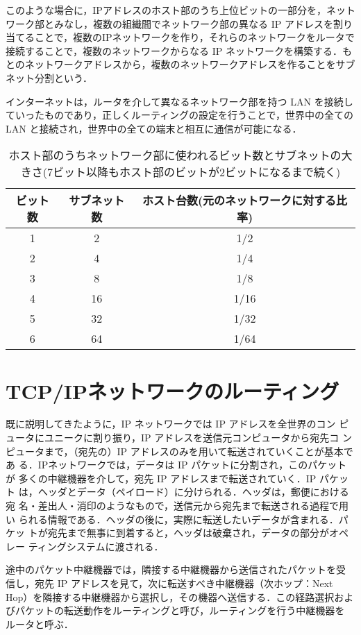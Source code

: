 このような場合に，IPアドレスのホスト部のうち上位ビットの一部分を，ネット
ワーク部とみなし，複数の組織間でネットワーク部の異なる IP アドレスを割り
当てることで，複数のIPネットワークを作り，それらのネットワークをルータで
接続することで，複数のネットワークからなる IP ネットワークを構築する．も
とのネットワークアドレスから，複数のネットワークアドレスを作ることをサブ
ネット分割という．

インターネットは，ルータを介して異なるネットワーク部を持つ LAN を接続し
ていったものであり，正しくルーティングの設定を行うことで，世界中の全ての
LAN と接続され，世界中の全ての端末と相互に通信が可能になる．


\begin{table}[tb]
  \centering
  \caption{ホスト部のうちネットワーク部に使われるビット数とサブネットの大きさ(7ビット以降もホスト部のビットが2ビットになるまで続く)}
  \begin{tabular}{c|c|c}
    \hline
   ビット数 & サブネット数 & ホスト台数(元のネットワークに対する比率)\\
    \hline
   1 & 2 & 1/2 \\
    \hline
   2 & 4 & 1/4 \\
    \hline
   3 & 8 & 1/8 \\
    \hline
   4 & 16 & 1/16 \\
    \hline
   5 & 32 & 1/32 \\
    \hline
   6 & 64 & 1/64 \\
    \hline
  \end{tabular}
\end{table}

\section{TCP/IPネットワークのルーティング}
既に説明してきたように，IP ネットワークでは IP アドレスを全世界のコン
ピュータにユニークに割り振り，IP アドレスを送信元コンピュータから宛先コ
ンピュータまで，（宛先の）IP アドレスのみを用いて転送されていくことが基本であ
る．IPネットワークでは，データは IP パケットに分割され，このパケットが
多くの中継機器を介して，宛先 IP アドレスまで転送されていく．IP パケット
は，ヘッダとデータ（ペイロード）に分けられる．ヘッダは，郵便における宛
名・差出人・消印のようなもので，送信元から宛先まで転送される過程で用い
られる情報である．ヘッダの後に，実際に転送したいデータが含まれる．パケッ
トが宛先まで無事に到着すると，ヘッダは破棄され，データの部分がオペレー
ティングシステムに渡される．

途中のパケット中継機器では，隣接する中継機器から送信されたパケットを受
信し，宛先 IP アドレスを見て，次に転送すべき中継機器（次ホップ：Next
Hop）を隣接する中継機器から選択し，その機器へ送信する．この経路選択およ
びパケットの転送動作をルーティングと呼び，ルーティングを行う中継機器を
ルータと呼ぶ．

